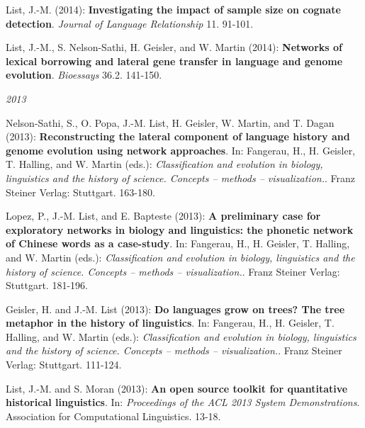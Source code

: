 \par
\nopagebreak\noindent List, J.-M. (2014): \textbf{Investigating the impact of sample size on cognate detection}. \textit{Journal of Language Relationship} 11. 91-101.\vspace{0.25cm}
\par
\nopagebreak\noindent List, J.-M., S. Nelson-Sathi, H. Geisler, and W. Martin (2014): \textbf{Networks of lexical borrowing and lateral gene transfer in language and genome evolution}. \textit{Bioessays} 36.2. 141-150.\vspace{0.25cm}
\par
\noindent\textit{2013}\par\nopagebreak\vspace{0.25cm}
\nopagebreak\noindent Nelson-Sathi, S., O. Popa, J.-M. List, H. Geisler, W. Martin, and T. Dagan (2013): \textbf{Reconstructing the lateral component of language history and genome evolution using network approaches}. In: Fangerau, H., H. Geisler, T. Halling, and W. Martin (eds.): \textit{Classification and evolution in biology, linguistics and the history of science. Concepts – methods – visualization.}. Franz Steiner Verlag: Stuttgart. 163-180.\vspace{0.25cm}
\par
\nopagebreak\noindent Lopez, P., J.-M. List, and E. Bapteste (2013): \textbf{A preliminary case for exploratory networks in biology and linguistics: the phonetic network of Chinese words as a case-study}. In: Fangerau, H., H. Geisler, T. Halling, and W. Martin (eds.): \textit{Classification and evolution in biology, linguistics and the history of science. Concepts – methods – visualization.}. Franz Steiner Verlag: Stuttgart. 181-196.\vspace{0.25cm}
\par
\nopagebreak\noindent Geisler, H. and J.-M. List (2013): \textbf{Do languages grow on trees? The tree metaphor in the history of linguistics}. In: Fangerau, H., H. Geisler, T. Halling, and W. Martin (eds.): \textit{Classification and evolution in biology, linguistics and the history of science. Concepts – methods – visualization.}. Franz Steiner Verlag: Stuttgart. 111-124.\vspace{0.25cm}
\par
\nopagebreak\noindent List, J.-M. and S. Moran (2013): \textbf{An open source toolkit for quantitative historical linguistics}. In: \textit{Proceedings of the ACL 2013 System Demonstrations}. Association for Computational Linguistics. 13-18.\vspace{0.25cm}
